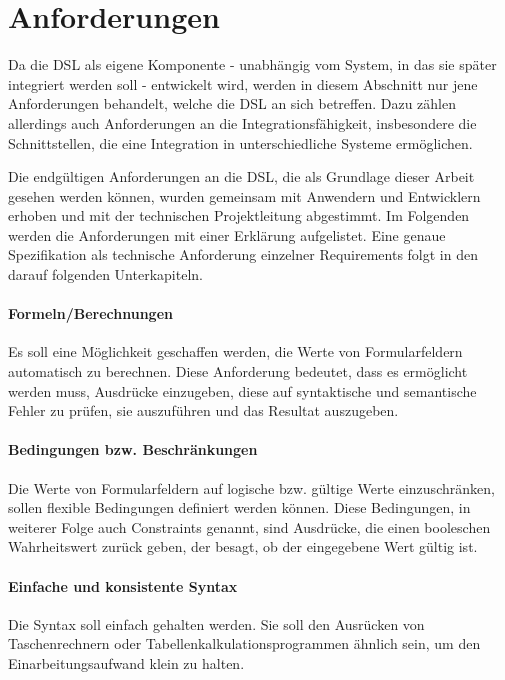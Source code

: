 \section{Anforderungen}

Da die DSL als eigene Komponente - unabhängig vom System, in das sie später integriert werden soll - entwickelt wird, werden in diesem Abschnitt nur jene Anforderungen behandelt, welche die DSL an sich betreffen. Dazu zählen allerdings auch Anforderungen an die Integrationsfähigkeit, insbesondere die Schnittstellen, die eine Integration in unterschiedliche Systeme ermöglichen.

Die endgültigen Anforderungen an die DSL, die als Grundlage dieser Arbeit gesehen werden können, wurden gemeinsam mit Anwendern und Entwicklern erhoben und mit der technischen Projektleitung abgestimmt. Im Folgenden werden die Anforderungen mit einer Erklärung aufgelistet. Eine genaue Spezifikation als technische Anforderung einzelner Requirements folgt in den darauf folgenden Unterkapiteln.


\label{par:ana-anf-formeln}
\paragraph*{Formeln/Berechnungen}
Es soll eine Möglichkeit geschaffen werden, die Werte von Formularfeldern automatisch zu berechnen. Diese Anforderung bedeutet, dass es er\-mög\-licht werden muss, Ausdrücke einzugeben, diese auf syntaktische und semantische Fehler zu prüfen, sie auszuführen und das Resultat auszugeben.

\paragraph*{Bedingungen bzw. Beschränkungen}
Die Werte von Formularfeldern auf logische bzw. gültige Werte einzuschränken, sollen flexible Bedingungen definiert werden können. Diese Bedingungen, in weiterer Folge auch Constraints genannt, sind Ausdrücke, die einen booleschen Wahrheitswert zurück geben, der besagt, ob der eingegebene Wert gültig ist.

\paragraph*{Einfache und konsistente Syntax}
Die Syntax soll einfach gehalten werden. Sie soll den Ausrücken von Taschenrechnern oder Tabellenkalkulationsprogrammen ähnlich sein, um den Einarbeitungsaufwand klein zu halten.

